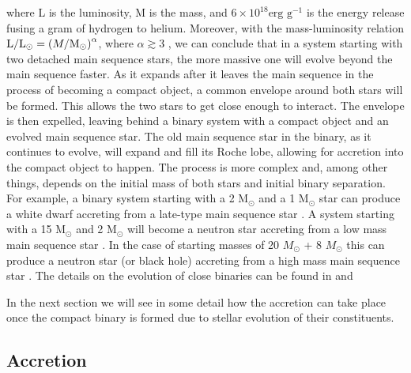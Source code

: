 \noindent where L is the luminosity, M is the mass,  and $6\times 10^{18} \text{erg g}^{-1}$ is the energy release fusing a gram of hydrogen to helium. Moreover, with the mass-luminosity relation $ \text L / \text L _\odot = \left  (M / \text M _\odot \right )^\alpha $, where $\alpha \gtrsim 3$ \citep[e.g.][]{de2008stars}, we can conclude that in a system starting with two detached main sequence stars, the more massive one will evolve beyond the main sequence faster. As it expands after it leaves the main sequence in the process of becoming a compact object, a common envelope around both stars will be formed. This allows the two stars to get close enough to interact. The envelope is then expelled, leaving behind a binary system with a compact object and an evolved main sequence star. The old main sequence star in the binary, as it continues to evolve, will expand and fill its Roche lobe, allowing for accretion into the compact object to happen.  The process is more complex and, among other things, depends on the initial mass of both stars and initial binary separation. For example, a binary system starting with a 2 M$_\odot$  and  a 1 M$_\odot$ star can produce a white dwarf accreting from a late-type main sequence star \citep{kippenhahn_entwicklung_1967,de_loore_structure_1992}. A system starting with a 15 M$_\odot$ and 2 M$_\odot$ will become a neutron star accreting from a low mass main sequence star \citep{heuvel_late_1976}. In the case of starting masses of 20 $M_\odot$ + 8 $M_\odot$ this can produce a neutron star (or black hole) accreting from a high mass main sequence star \citep{heuvel_late_1976}. The details on the evolution of close binaries can be found in \cite{postnov_evolution_2014} and \cite{de2008stars}


In the next section we will see in some detail how the accretion can take place once the compact binary is formed due to stellar evolution of their constituents. 

\subsection{Accretion}

